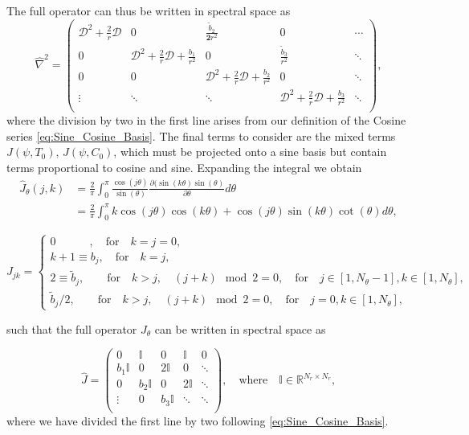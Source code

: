 \documentclass[a4paper]{article}
\begin{document}
\noindent The full operator can thus be written in spectral space as
\begin{equation}
\hat{\nabla}^2 = 
\begin{pmatrix}
\mathcal{D}^2 + \frac{2}{r} \mathcal{D} & 0 & \frac{\tilde{b}_2}{\boldsymbol{2}r^2}& 0 &\cdots \\
0 & \mathcal{D}^2 + \frac{2}{r} \mathcal{D} + \frac{b_1}{r^2} & 0 & \frac{\tilde{b}_3}{r^2} & \ddots \\
0 & 0 & \mathcal{D}^2 + \frac{2}{r} \mathcal{D} + \frac{b_2}{r^2} & 0 & \ddots \\
\vdots & \ddots & \ddots & \mathcal{D}^2 + \frac{2}{r} \mathcal{D} + \frac{b_ 3}{r^2} & \ddots \\
\end{pmatrix},
\label{eq:Nabla2_Discrete}
\end{equation}
where the division by two in the first line arises from our definition of the Cosine series \eqref{eq:Sine_Cosine_Basis}. The final terms to consider are the mixed terms $J(\psi, T_0), \, J(\psi, C_0)$, which must be projected onto a sine basis but contain terms proportional to cosine and sine. Expanding the integral we obtain
\begin{align*}
\hat{J}_{\theta}(j,k) &= \frac{2}{\pi} \int^{\pi}_{0} \frac{\cos(j \theta) }{\sin(\theta)} \frac{\partial ( \sin(k \theta) \sin(\theta ) }{\partial \theta} d \theta\, \\ 
&= \frac{2}{\pi} \int^{\pi}_{0}  k \cos(j \theta) \cos(k \theta) + \cos( j \theta) \sin (k \theta) \cot( \theta) d \theta, 
\end{align*}

\begin{equation}
J_{jk} = 
\begin{cases}
0 \quad\quad\quad, \quad \text{for} \quad k = j = 0, \\
k + 1 \equiv b_j, \quad \text{for} \quad k = j, \\
2 \equiv \tilde{b}_j, \quad\quad \text{for} \quad k > j, \quad (j+k) \mod 2 = 0, \quad \text{for} \quad j \in [1,N_{\theta}-1],  k \in [1,N_{\theta}], \\
\tilde{b}_j/2, \quad\quad \text{for} \quad k > j, \quad (j+k) \mod 2 = 0, \quad \text{for} \quad j =0,  k \in [1,N_{\theta}],
\end{cases}
\end{equation}

\noindent such that the full operator $J_{\theta}$ can be written in spectral space as

\begin{equation}
\hat{J} = 
\begin{pmatrix}
0 & \mathbb{I} & 0 & \mathbb{I}   & 0 \\
b_1 \mathbb{I} & 0 & 2 \mathbb{I} & 0 & \ddots \\
0 & b_2 \mathbb{I} & 0 & 2 \mathbb{I} & \ddots \\
\vdots & 0 & b_ 3 \mathbb{I} & \ddots & \ddots \\
\end{pmatrix}, \quad
\text{where} \quad \mathbb{I} \in \mathbb{R}^{N_r \times N_r},
\label{eq:J_THETA}
\end{equation}
where we have divided the first line by two following \eqref{eq:Sine_Cosine_Basis}.
\end{document}
